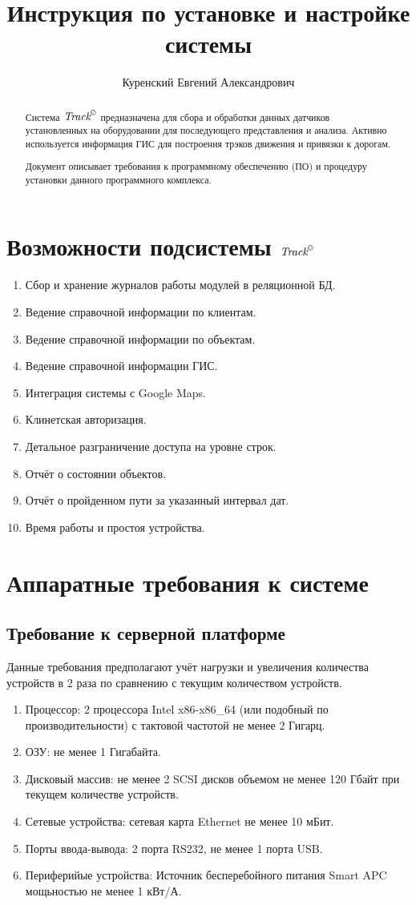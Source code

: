 \documentclass[12pt,a4paper]{article}
\author{Куренский Евгений Александрович}
\title{Инструкция по установке и настройке системы \Track{}}
\newcommand{\Track}{$\textit{Track}^{\textsc{\textcopyright}}$}
\begin{document}
\maketitle
\newpage
\tableofcontents
\newpage
\begin{abstract}
Система \Track{} предназначена для сбора и обработки данных датчиков установленных на оборудовании для последующего представления и анализа. Активно используется информация ГИС для построения трэков движения и привязки к дорогам.

Документ описывает требования к программному обеспечению (ПО) и процедуру установки данного программного комплекса.
\end{abstract}
\newpage
\section{Возможности подсистемы \Track{}}
\begin{enumerate}
\item Сбор и хранение журналов работы модулей в реляционной БД.
\item Ведение справочной информации по клиентам.
\item Ведение справочной информации по объектам.
\item Ведение справочной информации ГИС.
\item Интеграция системы с Google Maps.
\item Клинетская авторизация.
\item Детальное разграничение доступа на уровне строк.
\item Отчёт о состоянии объектов.
\item Отчёт о пройденном пути за указанный интервал дат.
\item Время работы и простоя устройства.
\end{enumerate}
\section{Аппаратные требования к системе}
\subsection{Требование к серверной платформе}
Данные требования предполагают учёт нагрузки и увеличения количества устройств в 2 раза по сравнению с текущим количеством устройств.
\begin{enumerate}
\item Процессор: 2 процессора Intel x86-x86\_64 (или подобный по производительности) с тактовой частотой не менее 2 Гигарц.
\item ОЗУ: не менее 1 Гигабайта.
\item Дисковый массив: не менее 2 SCSI дисков объемом не менее 120 Гбайт при текущем количестве устройств.
\item Сетевые устройства: сетевая карта Ethernet не менее 10 мБит.
\item Порты ввода-вывода: 2 порта RS232, не менее 1 порта USB.
\item Периферийые устройства: Источник бесперебойного питания Smart APC мощьностью не менее 1 кВт/А.
\end{enumerate}
\end{document}
